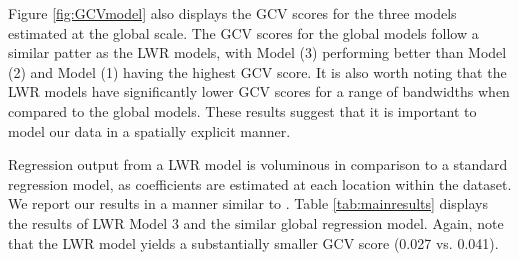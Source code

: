 \documentclass{article}\usepackage{graphicx, color}
\begin{document}
Figure \ref{fig:GCVmodel} also displays the GCV scores for the three models estimated at the global scale. The GCV scores for the global models follow a similar patter as the LWR models, with Model (3) performing better than Model (2) and Model (1) having the highest GCV score. It is also worth noting that the LWR models have significantly lower GCV scores for a range of bandwidths when compared to the global models. These results suggest that it is important to model our data in a spatially explicit manner.

Regression output from a LWR model is voluminous in comparison to a standard regression model, as coefficients are estimated at each location within the dataset. We report our results in a manner similar to \citet{MarmolejoDuarteCarlos;GonzalezTamez2009}. Table \ref{tab:mainresults} displays the results of LWR Model 3 and the similar global regression model. Again, note that the LWR model yields a substantially smaller GCV score (0.027 vs. 0.041).

\end{document}
